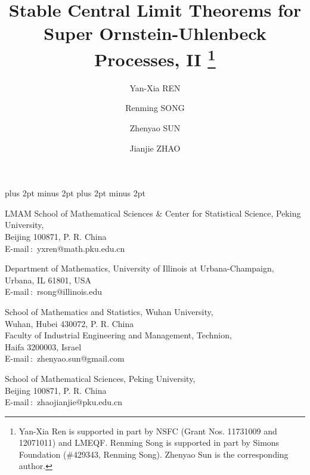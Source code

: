 \documentclass{amse-new}
\numberwithin{equation}{section}
\begin{document}
\abovedisplayskip 6pt plus 2pt minus 2pt \belowdisplayskip 6pt
plus 2pt minus 2pt
\def\vsp{\vspace{1mm}}
\def\th#1{\vspace{1mm}\noindent{\bf #1}\quad}
\def\proof{\vspace{1mm}\noindent{\it Proof}\quad}
\def\no{\nonumber}
\newenvironment{prof}[1][Proof]{\noindent\textit{#1}\quad }
{\hfill $\Box$\vspace{0.7mm}}
\def\q{\quad} \def\qq{\qquad}
\allowdisplaybreaks[4]
\theoremstyle{definition}
\newtheorem{asp}{Assumption}


\title{Stable Central Limit Theorems for Super Ornstein-Uhlenbeck Processes, II
\footnote{Yan-Xia Ren is supported in part by NSFC (Grant Nos. 11731009 and 12071011) and LMEQF. Renming Song is supported in part by Simons Foundation (\#429343, Renming Song). Zhenyao Sun is the corresponding author.}} 

\author{Yan-Xia \uppercase{Ren}}             %
    {LMAM School of Mathematical Sciences \& Center for Statistical Science, Peking University, \\
	    Beijing 100871, P. R. China \\
    E-mail\,$:$ yxren@math.pku.edu.cn}

    \author{Renming \uppercase{Song}} 
    {Department of Mathematics, University of Illinois at Urbana-Champaign, \\
  	Urbana, IL 61801, USA\\
    E-mail\,$:$ rsong@illinois.edu}

    \author{Zhenyao \uppercase{Sun}} 
    {School of Mathematics and Statistics, Wuhan University, \\
  	Wuhan, Hubei 430072, P. R. China \\
	Faculty of Industrial Engineering and Management, Technion, \\
	Haifa 3200003, Israel\\
    E-mail\,$:$ zhenyao.sun@gmail.com}

    \author{Jianjie \uppercase{Zhao}} 
    {School of Mathematical Sciences, Peking University,\\
  	Beijing 100871, P. R. China\\
    E-mail\,$:$ zhaojianjie@pku.edu.cn}
\end{document}
